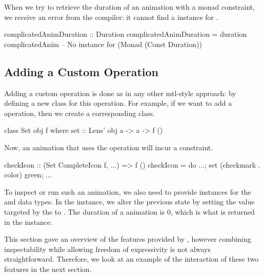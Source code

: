 When we try to retrieve the duration of an animation with a monad constraint,
we receive an error from the compiler: it cannot find a  instance for
.

\begin{spec}
complicatedAnimDuration :: Duration
complicatedAnimDuration = duration complicatedAnim
-- No instance for (Monad (Const Duration))
\end{spec}

\subsection{Adding a Custom Operation}

Adding a custom operation is done as in any other mtl-style approach: by defining a new class for this operation. For example, if we want to add a  operation, then we create a corresponding  class.

\begin{code}
class Set obj f where set :: Lens' obj a -> a -> f ()
\end{code}

Now, an animation that uses the  operation will incur a  constraint.

\begin{code}
checkIcon :: (Set CompleteIcon f, ...) => f ()
checkIcon = do ...; set (checkmark . color) green; ...
\end{code}

To inspect or run such an animation, we also need to provide instances for the  and  data types. In the  instance, we alter the previous state by setting the value targeted by the  to . The duration of a  animation is 0, which is what is returned in the  instance.


This section gave an overview of the features provided by \dsl{}, however combining inspectability while allowing freedom of expressivity is not always straightforward. Therefore, we look at an example of the interaction of these two features in the next section.

